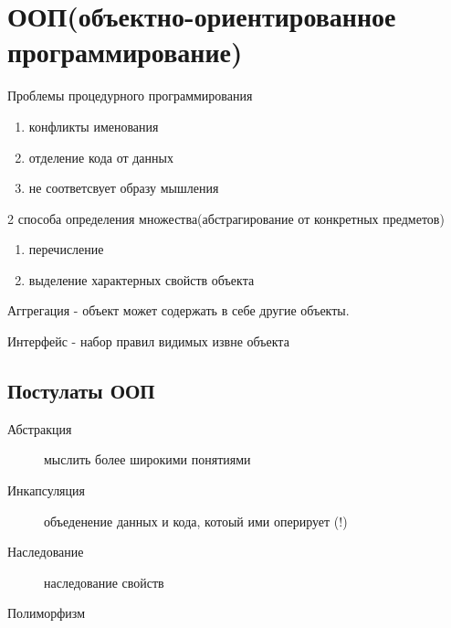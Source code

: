\section{ООП(объектно-ориентированное программирование)}
Проблемы процедурного программирования
\begin{enumerate}
  \item конфликты именования
  \item отделение кода от данных
  \item не соответсвует образу мышления
\end{enumerate}

2 способа определения множества(абстрагирование от конкретных предметов)
\begin{enumerate}
  \item перечисление
  \item выделение характерных свойств объекта
\end{enumerate}

\begin{definition}
  Аггрегация - объект может содержать в себе другие объекты.
\end{definition}

\begin{definition}
  Интерфейс - набор правил видимых извне объекта
\end{definition}

\subsection{Постулаты ООП}

\begin{description}
  \item[Абстракция] мыслить более широкими понятиями
  \item[Инкапсуляция] объеденение данных и кода, котоый ими оперирует (!)
  \item[Наследование] наследование свойств
  \item[Полиморфизм]
\end{description}
